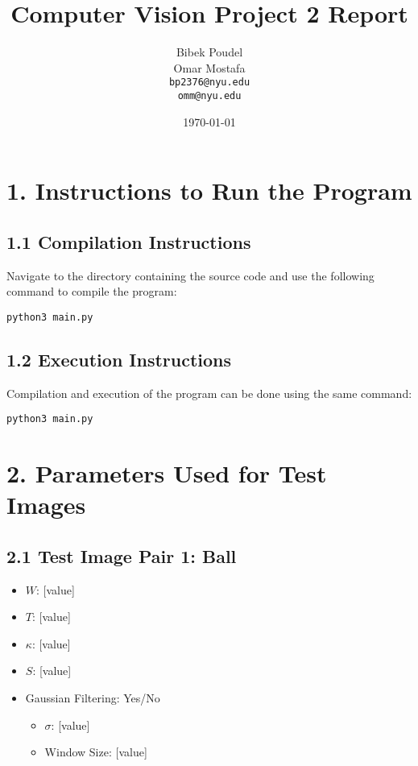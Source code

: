 \documentclass[12pt]{article}
\title{Computer Vision Project 2 Report}
\author{
    Bibek Poudel \\ Omar Mostafa \\ 
    \texttt{bp2376@nyu.edu} \\ \texttt{omm@nyu.edu}
}
\date{\today}
\begin{document}
\maketitle

\section*{1. Instructions to Run the Program}

\subsection*{1.1 Compilation Instructions}
Navigate to the directory containing the source code and use the following command to compile the program:
\begin{verbatim}
python3 main.py
\end{verbatim}

\subsection*{1.2 Execution Instructions}
Compilation and execution of the program can be done using the same command:
\begin{verbatim}
python3 main.py
\end{verbatim}

\section*{2. Parameters Used for Test Images}

\subsection*{2.1 Test Image Pair 1: Ball}
\begin{itemize}
    \item $W$: [value]
    \item $T$: [value]
    \item $\kappa$: [value]
    \item $S$: [value]
    \item Gaussian Filtering: Yes/No
    \begin{itemize}
        \item $\sigma$: [value]
        \item Window Size: [value]
    \end{itemize}
\end{itemize}
\end{document}
